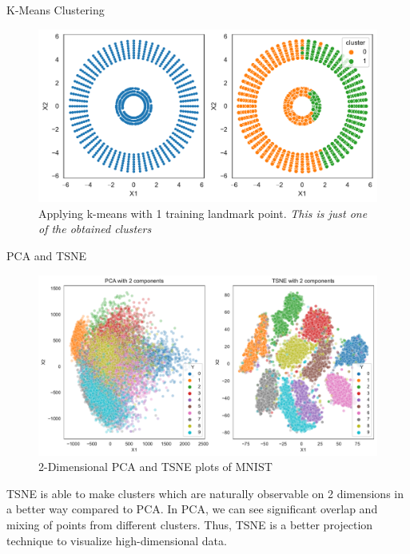 \documentclass[a4paper,11pt]{article}
\begin{document}
\begin{mlsolution}
\begin{section}{K-Means Clustering}
        \begin{figure}[h]
            \centering
            \includegraphics[width=.5\textwidth]{images/k-means-landmark.pdf}
            \caption{Applying k-means with 1 training landmark point. \textit{This is just one of the obtained clusters}}
            \label{fig:k-means-landmark}
        \end{figure}

    \end{section}

    \begin{section}{PCA and TSNE}
        \begin{figure}[h]
            \includegraphics[width=\textwidth]{images/pca-tsne.pdf}
            \caption{2-Dimensional PCA and TSNE plots of MNIST}
            \label{fig:pca-tsne}
        \end{figure}
        TSNE is able to make clusters which are naturally observable on 2 dimensions in a better way compared to PCA. In PCA, we can see significant overlap and mixing of points from different clusters. Thus, TSNE is a better projection technique to visualize high-dimensional data.
    \end{section}

\end{mlsolution}
\end{document}
